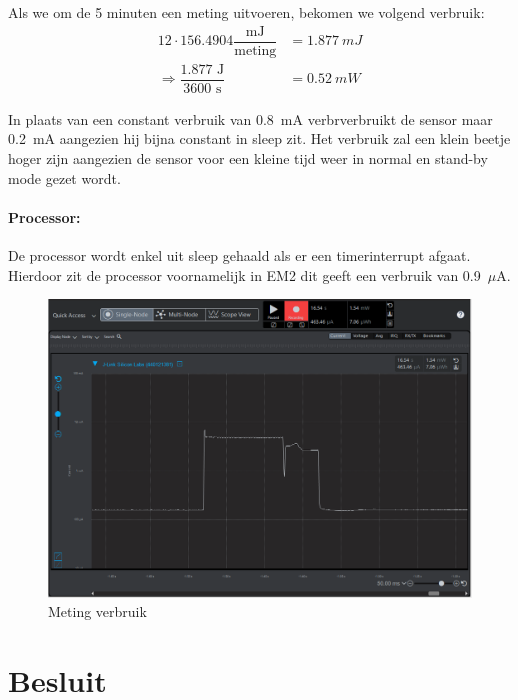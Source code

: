 \documentclass[]{article}
\begin{document}
Als we om de 5 minuten een meting uitvoeren, bekomen we volgend verbruik:
\begin{align*}
	12\cdot 156.4904 \dfrac{\text{mJ}}{\text{meting}} &=  \SI{1.877}{mJ} \\
	\Rightarrow \dfrac{1.877\text{ J}}{3600\text{ s}} &= \SI{0.52}{mW}
\end{align*}




In plaats van een constant verbruik van 0.8~mA verbrverbruikt de sensor maar 0.2~mA aangezien hij bijna constant in sleep zit. Het verbruik zal een klein beetje hoger zijn aangezien de sensor voor een kleine tijd weer in normal en stand-by mode gezet wordt. 
\paragraph{Processor: }
De processor wordt enkel uit sleep gehaald als er een timerinterrupt afgaat. Hierdoor zit de processor voornamelijk in EM2 dit geeft een verbruik van 0.9~$\mu$A.


\begin{figure}[h!]
	\centering
	\includegraphics[width=\columnwidth]{final_energy_consumption.png}
	\caption{Meting verbruik}
	\label{fig:meting}
\end{figure}





\newpage

\section{Besluit }
\end{document}
